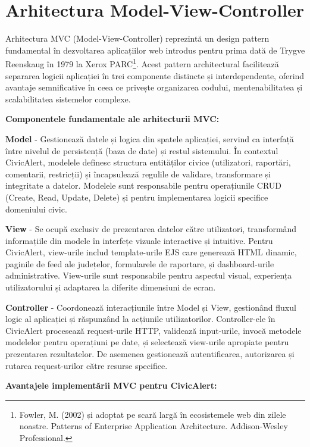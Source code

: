 \documentclass[12pt,a4paper]{report}
\begin{document}
\section{Arhitectura Model-View-Controller}

Arhitectura MVC (Model-View-Controller) reprezintă un design pattern fundamental în dezvoltarea aplicațiilor web introdus pentru prima dată de Trygve Reenskaug în 1979 la Xerox PARC\footnote{Fowler, M. (2002) și adoptat pe scară largă în ecosistemele web din zilele noastre. Patterns of Enterprise Application Architecture. Addison-Wesley Professional.}. Acest pattern architectural facilitează separarea logicii aplicației în trei componente distincte și interdependente, oferind avantaje semnificative în ceea ce privește organizarea codului, mentenabilitatea și scalabilitatea sistemelor complexe.

\textbf{Componentele fundamentale ale arhitecturii MVC:}

\textbf{Model} - Gestionează datele și logica din spatele aplicației, servind ca interfață între nivelul de persistență (baza de date) și restul sistemului. În contextul CivicAlert, modelele definesc structura entităților civice (utilizatori, raportări, comentarii, restricții) și încapsulează regulile de validare, transformare și integritate a datelor. Modelele sunt responsabile pentru operațiunile CRUD (Create, Read, Update, Delete) și pentru implementarea logicii specifice domeniului civic.

\textbf{View} - Se ocupă exclusiv de prezentarea datelor către utilizatori, transformând informațiile din modele în interfețe vizuale interactive și intuitive. Pentru CivicAlert, view-urile includ template-urile EJS care generează HTML dinamic, paginile de feed ale județelor, formularele de raportare, și dashboard-urile administrative. View-urile sunt responsabile pentru aspectul visual, experiența utilizatorului și adaptarea la diferite dimensiuni de ecran.

\textbf{Controller} - Coordonează interacțiunile între Model și View, gestionând fluxul logic al aplicației și răspunzând la acțiunile utilizatorilor. Controller-ele în CivicAlert procesează request-urile HTTP, validează input-urile, invocă metodele modelelor pentru operațiuni pe date, și selectează view-urile apropiate pentru prezentarea rezultatelor. De asemenea gestionează autentificarea, autorizarea și rutarea request-urilor către resurse specifice.

\textbf{Avantajele implementării MVC pentru CivicAlert:}
\end{document}
